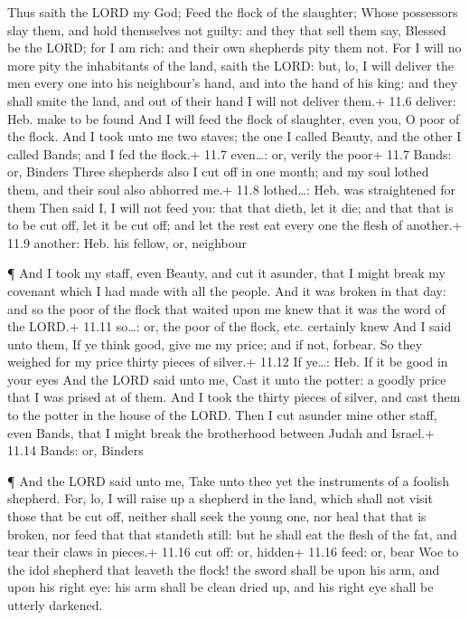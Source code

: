  Thus saith the LORD my God; Feed the flock of the
slaughter;  Whose possessors slay them, and hold themselves
not guilty: and they that sell them say, Blessed be the LORD; for I am
rich: and their own shepherds pity them not.  For I will no
more pity the inhabitants of the land, saith the LORD: but, lo, I will
deliver the men every one into his neighbour's hand, and into the hand
of his king: and they shall smite the land, and out of their hand I will
not deliver them.+ 11.6 deliver: Heb. make to be found  And
I will feed the flock of slaughter, even you, O poor of the flock. And I
took unto me two staves; the one I called Beauty, and the other I called
Bands; and I fed the flock.+ 11.7 even\ldots: or, verily the poor+ 11.7
Bands: or, Binders  Three shepherds also I cut off in one
month; and my soul lothed them, and their soul also abhorred me.+ 11.8
lothed\ldots: Heb. was straightened for them  Then said I, I
will not feed you: that that dieth, let it die; and that that is to be
cut off, let it be cut off; and let the rest eat every one the flesh of
another.+ 11.9 another: Heb. his fellow, or, neighbour

 ¶ And I took my staff, even Beauty, and cut it asunder,
that I might break my covenant which I had made with all the people.
 And it was broken in that day: and so the poor of the
flock that waited upon me knew that it was the word of the LORD.+ 11.11
so\ldots: or, the poor of the flock, etc. certainly knew 
And I said unto them, If ye think good, give me my price; and if not,
forbear. So they weighed for my price thirty pieces of silver.+ 11.12 If
ye\ldots: Heb. If it be good in your eyes  And the LORD
said unto me, Cast it unto the potter: a goodly price that I was prised
at of them. And I took the thirty pieces of silver, and cast them to the
potter in the house of the LORD.  Then I cut asunder mine
other staff, even Bands, that I might break the brotherhood between
Judah and Israel.+ 11.14 Bands: or, Binders

 ¶ And the LORD said unto me, Take unto thee yet the
instruments of a foolish shepherd.  For, lo, I will raise
up a shepherd in the land, which shall not visit those that be cut off,
neither shall seek the young one, nor heal that that is broken, nor feed
that that standeth still: but he shall eat the flesh of the fat, and
tear their claws in pieces.+ 11.16 cut off: or, hidden+ 11.16 feed: or,
bear  Woe to the idol shepherd that leaveth the flock! the
sword shall be upon his arm, and upon his right eye: his arm shall be
clean dried up, and his right eye shall be utterly darkened.

